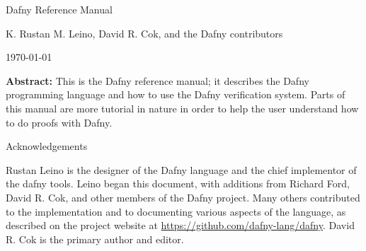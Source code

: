 \begin{center}\Huge Dafny Reference Manual\end{center}
\begin{center}K. Rustan M. Leino, David R. Cok, and the Dafny contributors\end{center}
\begin{center}\today\end{center}
\vspace{1in}
\textbf{Abstract:} This is the Dafny reference manual; it describes the Dafny programming
language and how to use the Dafny verification system.
Parts of this manual are more tutorial in nature in order to help the
user understand how to do proofs with Dafny.

\vspace{1in}
\begin{center}\Large Acknowledgements\end{center}
Rustan Leino is the designer of the Dafny language and the chief implementor of the dafny tools. 
Leino began this document, with additions from Richard Ford, David R. Cok, and other members of the Dafny project.
Many others contributed to the implementation and to documenting various aspects of the language, as described on the project website at \url{https://github.com/dafny-lang/dafny}.
David R. Cok is the primary author and editor.
\newpage
